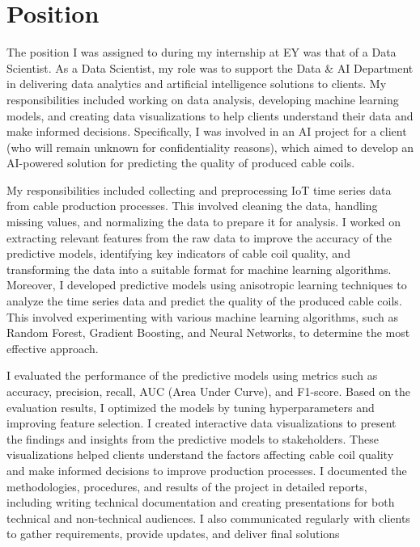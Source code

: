 \section{Position}

The position I was assigned to during my internship at EY was that of a Data
Scientist. As a Data Scientist, my role was to support the Data \& AI
Department in delivering data analytics and artificial intelligence solutions
to clients. My responsibilities included working on data analysis, developing
machine learning models, and creating data visualizations to help clients
understand their data and make informed decisions. Specifically, I was involved
in an AI project for a client (who will remain unknown for confidentiality reasons),
which aimed to develop an AI-powered solution for predicting the quality of
produced cable coils.

My responsibilities included collecting and preprocessing IoT time series data
from cable production processes. This involved cleaning the data, handling
missing values, and normalizing the data to prepare it for analysis. I worked
on extracting relevant features from the raw data to improve the accuracy of
the predictive models, identifying key indicators of cable coil quality, and
transforming the data into a suitable format for machine learning algorithms.
Moreover, I developed predictive models using anisotropic learning techniques
to analyze the time series data and predict the quality of the produced cable
coils. This involved experimenting with various machine learning algorithms,
such as Random Forest, Gradient Boosting, and Neural Networks, to determine the
most effective approach.

I evaluated the performance of the predictive models using metrics such as
accuracy, precision, recall, AUC (Area Under Curve), and F1-score. Based on the
evaluation results, I optimized the models by tuning hyperparameters and
improving feature selection. I created interactive data visualizations to
present the findings and insights from the predictive models to stakeholders.
These visualizations helped clients understand the factors affecting cable coil
quality and make informed decisions to improve production processes. I
documented the methodologies, procedures, and results of the project in
detailed reports, including writing technical documentation and creating
presentations for both technical and non-technical audiences. I also
communicated regularly with clients to gather requirements, provide updates,
and deliver final solutions

